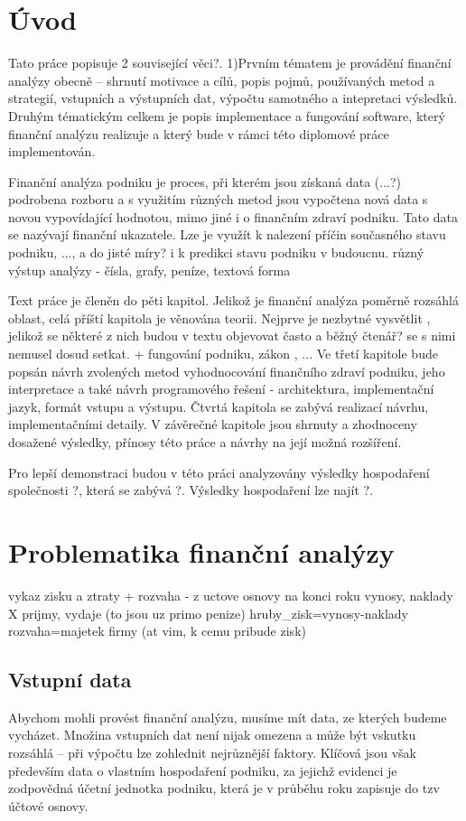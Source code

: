 \chapter{Úvod}
Tato práce popisuje 2 související věci?. 
1)Prvním tématem je provádění finanční analýzy obecně -- shrnutí motivace a cílů, popis pojmů, používaných metod a strategií, vstupních a výstupních dat, výpočtu samotného a intepretaci výsledků. Druhým tématickým celkem je popis implementace a fungování software, který finanční analýzu realizuje a který bude v rámci této diplomové práce implementován.

Finanční analýza podniku je proces, při kterém jsou získaná data (...?) podrobena rozboru a s využitím různých metod jsou vypočtena nová data s novou vypovídající hodnotou, mimo jiné i o finančním zdraví podniku. Tato data se nazývají finanční ukazatele. Lze je využít k nalezení příčin současného stavu podniku, ..., a do jisté míry? i k predikci stavu podniku v budoucnu.
různý výstup analýzy - čísla, grafy, peníze, textová forma

Text práce je členěn do pěti kapitol. Jelikož je finanční analýza poměrně rozsáhlá oblast, celá příští kapitola je věnována teorii. Nejprve je nezbytné vysvětlit , jelikož se některé z nich budou v textu objevovat často a běžný čtenář? se s nimi nemusel dosud setkat. + fungování podniku, zákon , ...
Ve třetí kapitole bude popsán návrh zvolených metod vyhodnocování finančního zdraví podniku, jeho interpretace a také návrh programového řešení - architektura, implementační jazyk, formát vstupu a výstupu. Čtvrtá kapitola se zabývá realizací návrhu, implementačními detaily. V závěrečné kapitole jsou shrnuty a zhodnoceny dosažené výsledky, přínosy této práce a návrhy na její možná rozšíření.

Pro lepší demonstraci budou v této práci analyzovány výsledky hospodaření společnosti ?, která se zabývá ?. Výsledky hospodaření lze najít ?.

\chapter{Problematika finanční analýzy}

vykaz zisku a ztraty + rozvaha - z uctove osnovy na konci roku
vynosy, naklady X prijmy, vydaje (to jsou uz primo penize)
hruby\_zisk=vynosy-naklady
rozvaha=majetek firmy (at vim, k cemu pribude zisk)

\section{Vstupní data}
Abychom mohli provést finanční analýzu, musíme mít data, ze kterých budeme vycházet. Množina vstupních dat není nijak omezena a může být vskutku rozsáhlá -- při výpočtu lze zohlednit nejrůznější faktory. Klíčová jsou však především data o vlastním hospodaření podniku, za jejichž evidenci je zodpovědná účetní jednotka podniku, která je v průběhu roku zapisuje do tzv účtové osnovy.
